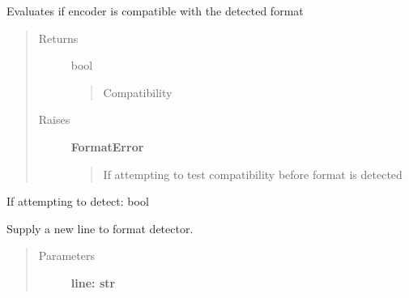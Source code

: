 \documentclass[letterpaper,10pt,english]{sphinxmanual}
\begin{document}
\begin{fulllineitems}

\begin{fulllineitems}
\label{fseq.reading:fseq.reading.seq_encoder.SeqFormatDetector.FORMATS}
\end{fulllineitems}


\begin{fulllineitems}
\label{fseq.reading:fseq.reading.seq_encoder.SeqFormatDetector.compatible}
Evaluates if encoder is compatible with the detected format
\begin{quote}\begin{description}
\item[{Returns}] \leavevmode
bool
\begin{quote}

Compatibility
\end{quote}

\item[{Raises}] \leavevmode
\textbf{FormatError}
\begin{quote}

If attempting to test compatibility before format is detected
\end{quote}

\end{description}\end{quote}

\end{fulllineitems}


\begin{fulllineitems}
\label{fseq.reading:fseq.reading.seq_encoder.SeqFormatDetector.detecting}
If attempting to detect: bool

\end{fulllineitems}


\begin{fulllineitems}
\label{fseq.reading:fseq.reading.seq_encoder.SeqFormatDetector.feed}
Supply a new line to format detector.
\begin{quote}\begin{description}
\item[{Parameters}] \leavevmode
\textbf{line: str}
\begin{quote}


\end{quote}
\end{description}
\end{quote}
\end{fulllineitems}
\end{fulllineitems}
\end{document}
